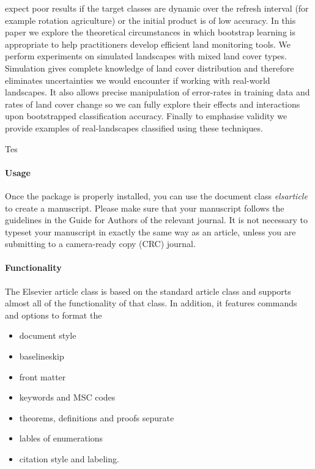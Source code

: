 expect poor results if the target classes are dynamic over the refresh interval (for example rotation agriculture) or the initial product is of low accuracy.  In this paper we explore the theoretical circumstances in which bootstrap learning is appropriate to help practitioners develop efficient land monitoring tools.  We perform experiments on simulated landscapes with mixed land cover types.  Simulation gives complete knowledge of land cover distribution and therefore eliminates uncertainties we would encounter if working with real-world landscapes.  It also allows precise manipulation of error-rates in training data and rates of land cover change so we can fully explore their effects and interactions upon bootstrapped classification accuracy.  Finally to emphasise validity we provide examples of real-landscapes classified using these techniques.

Tes 


\paragraph{Usage} Once the package is properly installed, you can use the document class \emph{elsarticle} to create a manuscript. Please make sure that your manuscript follows the guidelines in the Guide for Authors of the relevant journal. It is not necessary to typeset your manuscript in exactly the same way as an article, unless you are submitting to a camera-ready copy (CRC) journal.

\paragraph{Functionality} The Elsevier article class is based on the standard article class and supports almost all of the functionality of that class. In addition, it features commands and options to format the
\begin{itemize}
\item document style
\item baselineskip
\item front matter
\item keywords and MSC codes
\item theorems, definitions and proofs sepurate
\item lables of enumerations
\item citation style and labeling.
\end{itemize}